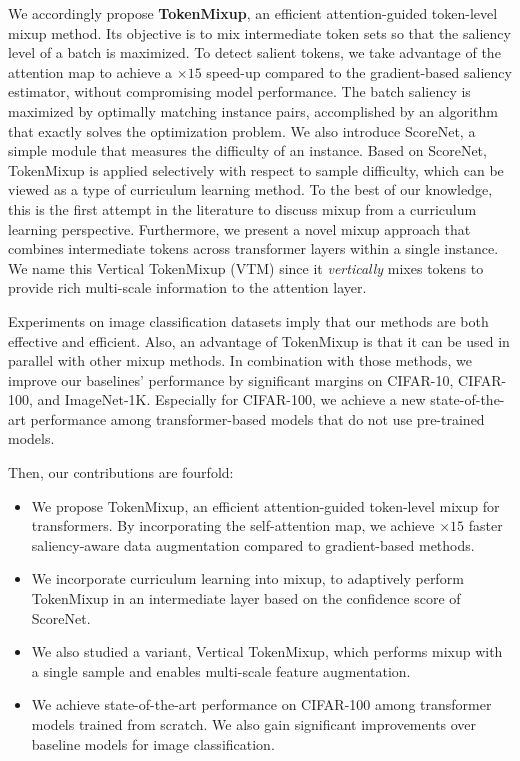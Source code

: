 \documentclass{article}
\begin{document}
We accordingly propose \textbf{TokenMixup}, an efficient attention-guided token-level mixup method.
Its objective is to mix intermediate token sets so that the saliency level of a batch is maximized.
To detect salient tokens, we take advantage of the attention map to achieve a $\times15$ speed-up compared to the gradient-based saliency estimator, without compromising model performance.
The batch saliency is maximized by optimally matching instance pairs, accomplished by an algorithm that exactly solves the optimization problem.
We also introduce ScoreNet, a simple module that measures the difficulty of an instance.
Based on ScoreNet, TokenMixup is applied selectively with respect to sample difficulty, which can be viewed as a type of curriculum learning method.
To the best of our knowledge, this is the first attempt in the literature to discuss mixup from a curriculum learning perspective.
Furthermore, we present a novel mixup approach that combines intermediate tokens across transformer layers within a single instance.
We name this Vertical TokenMixup (VTM) since it \textit{vertically} mixes tokens to provide rich multi-scale information to the attention layer.

Experiments on image classification datasets imply that our methods are both effective and efficient.
Also, an advantage of TokenMixup is that it can be used in parallel with other mixup methods.
In combination with those methods, we improve our baselines' performance by significant
margins on CIFAR-10, CIFAR-100, and ImageNet-1K.
Especially for CIFAR-100, we achieve a new state-of-the-art performance among transformer-based models that do not use pre-trained models.

Then, our contributions are fourfold:
\begin{itemize}[leftmargin=*]
\item We propose TokenMixup, an efficient attention-guided token-level mixup for transformers. By incorporating the self-attention map, we achieve $\times15$ faster saliency-aware data augmentation compared to gradient-based methods.
\item We incorporate curriculum learning into mixup, to adaptively perform TokenMixup in an intermediate layer based on the confidence score of ScoreNet.

\item We also studied a variant, Vertical TokenMixup, which performs mixup with a single sample and enables multi-scale feature augmentation.

\item We achieve state-of-the-art performance on CIFAR-100 among transformer models trained from scratch. We also gain significant improvements over baseline models for image classification.
\end{itemize}
\end{document}

